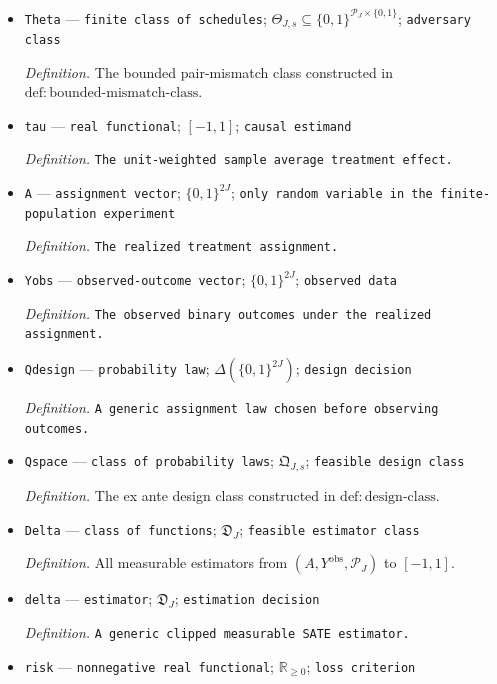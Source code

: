 \documentclass{article}
\begin{document}
\begin{itemize}
  \item \texttt{Theta} --- \texttt{finite class of schedules}; \(\Theta_{J,s}\subseteq\{0,1\}^{\mathcal P_J\times\{0,1\}}\); \texttt{adversary class}
  \par\smallskip\noindent\emph{Definition.} The bounded pair-mismatch class constructed in \(\mathrm{def:bounded\text{-}mismatch\text{-}class}\).
  \item \texttt{tau} --- \texttt{real functional}; \([-1,1]\); \texttt{causal estimand}
  \par\smallskip\noindent\emph{Definition.} \texttt{The unit-\allowbreak{}weighted sample average treatment effect.}
  \item \texttt{A} --- \texttt{assignment vector}; \(\{0,1\}^{2J}\); \texttt{only random variable in the finite-\allowbreak{}population experiment}
  \par\smallskip\noindent\emph{Definition.} \texttt{The realized treatment assignment.}
  \item \texttt{Yobs} --- \texttt{observed-\allowbreak{}outcome vector}; \(\{0,1\}^{2J}\); \texttt{observed data}
  \par\smallskip\noindent\emph{Definition.} \texttt{The observed binary outcomes under the realized assignment.}
  \item \texttt{Qdesign} --- \texttt{probability law}; \(\Delta(\{0,1\}^{2J})\); \texttt{design decision}
  \par\smallskip\noindent\emph{Definition.} \texttt{A generic assignment law chosen before observing outcomes.}
  \item \texttt{Qspace} --- \texttt{class of probability laws}; \(\mathfrak Q_{J,s}\); \texttt{feasible design class}
  \par\smallskip\noindent\emph{Definition.} The ex ante design class constructed in \(\mathrm{def:design\text{-}class}\).
  \item \texttt{Delta} --- \texttt{class of functions}; \(\mathfrak D_J\); \texttt{feasible estimator class}
  \par\smallskip\noindent\emph{Definition.} All measurable estimators from \((A,Y^{\mathrm{obs}},\mathcal P_J)\) to \([-1,1]\).
  \item \texttt{delta} --- \texttt{estimator}; \(\mathfrak D_J\); \texttt{estimation decision}
  \par\smallskip\noindent\emph{Definition.} \texttt{A generic clipped measurable SATE estimator.}
  \item \texttt{risk} --- \texttt{nonnegative real functional}; \(\mathbb R_{\ge0}\); \texttt{loss criterion}

\end{itemize}
\end{document}
